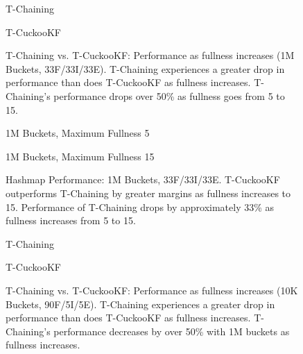 \begin{figure}[H]
    \centering
    \begin{minipage}{0.7\textwidth}
    \caption*{T-Chaining}
        \vspace{12pt}
    \end{minipage}
    \begin{minipage}{0.7\textwidth}
    \caption*{T-CuckooKF}
    \end{minipage}
    \caption[T-Chaining vs. T-CuckooKF: Performance as fullness increases (1M Buckets, 33F/33I/33E)]{T-Chaining vs. T-CuckooKF: Performance as fullness increases (1M Buckets, 33F/33I/33E). T-Chaining experiences a greater drop in performance than does T-CuckooKF as fullness increases. T-Chaining's performance drops over 50\% as fullness goes from 5 to 15.}
    \label{fig:hm_fullness_33_2}
\end{figure}

\begin{figure}[H]
    \centering
    \begin{minipage}{0.75\textwidth}
    \caption*{1M Buckets, Maximum Fullness 5}
        \vspace{12pt}
    \end{minipage}
   \begin{minipage}{0.75\textwidth}
    \caption*{1M Buckets, Maximum Fullness 15}
        \vspace{12pt}
    \end{minipage}
	\caption[Hashmap Performance: 1M Buckets, 33F/33I/33E]{Hashmap Performance: 1M Buckets, 33F/33I/33E. T-CuckooKF outperforms T-Chaining by greater margins as fullness increases to 15. Performance of T-Chaining drops by approximately 33\% as fullness increases from 5 to 15.}
    \label{fig:hm_33_3}
\end{figure}

\begin{figure}[H]
    \centering
    \begin{minipage}{0.70\textwidth}
    \caption*{T-Chaining}
        \vspace{12pt}
    \end{minipage}
    \begin{minipage}{0.70\textwidth}
    \caption*{T-CuckooKF}
    \end{minipage}
    \caption[T-Chaining vs. T-CuckooKF: Performance as fullness increases (1M Buckets, 90F/5I/5E)]{T-Chaining vs. T-CuckooKF: Performance as fullness increases (10K Buckets, 90F/5I/5E). T-Chaining experiences a greater drop in performance than does T-CuckooKF as fullness increases. T-Chaining's performance decreases by over 50\% with 1M buckets as fullness increases.}
    \label{fig:hm_fullness_90_2}
\end{figure}

